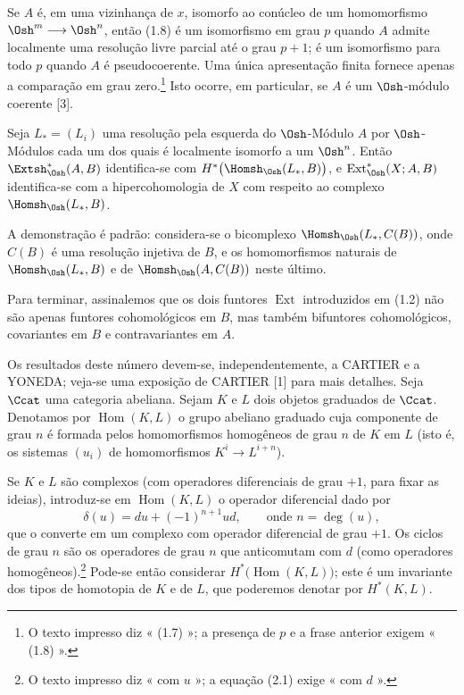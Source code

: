  Se $A$ é, em uma vizinhança de $x$, isomorfo ao
conúcleo de um homomorfismo $\Osh^{m}\longrightarrow\Osh^{n}$, então (1.8) é um isomorfismo em grau $p$ quando $A$ admite localmente uma resolução livre parcial até o grau $p+1$; é um isomorfismo para todo $p$ quando $A$ é pseudocoerente. Uma única apresentação finita fornece apenas a comparação em grau zero.\footnote{O texto impresso diz « (1.7) »; a
presença de $p$ e a frase anterior exigem « (1.8) ».} Isto ocorre, em
particular, se $A$ é um $\Osh$-módulo coerente [3].

 Seja $L_{*}=(L_i)$ uma resolução pela esquerda do
$\Osh$-Módulo $A$ por $\Osh$-Módulos cada um dos quais é localmente isomorfo a
um $\Osh^{n}$. Então $\Extsh_{\Osh}^{*}(A,B)$ identifica-se com
$H^{*}\bigl(\Homsh_{\Osh}(L_{*},B)\bigr)$, e
$\operatorname{Ext}_{\Osh}^{*}(X;A,B)$ identifica-se com a hipercohomologia de $X$
com respeito ao complexo $\Homsh_{\Osh}(L_{*},B)$.

A demonstração é padrão: considera-se o bicomplexo
$\Homsh_{\Osh}(L_{*},C(B))$, onde $C(B)$ é uma resolução injetiva de $B$, e os
homomorfismos naturais de $\Homsh_{\Osh}(L_{*},B)$ e de
$\Homsh_{\Osh}(A,C(B))$ neste último.

Para terminar, assinalemos que os dois funtores $\operatorname{Ext}$ introduzidos
em (1.2) não são apenas funtores cohomológicos em $B$, mas também
bifuntores cohomológicos, covariantes em $B$ e contravariantes em $A$.


Os resultados deste número devem-se, independentemente, a CARTIER e a YONEDA; veja-se
uma exposição de CARTIER [1] para mais detalhes. Seja $\Ccat$ uma categoria abeliana.
Sejam $K$ e $L$ dois objetos graduados de $\Ccat$. Denotamos por
$\operatorname{Hom}(K,L)$ o grupo abeliano graduado cuja componente de grau
$n$ é formada pelos homomorfismos homogêneos de grau $n$ de $K$ em $L$ (isto é,
os sistemas $(u_i)$ de homomorfismos $K^{i}\longrightarrow L^{i+n}$).

Se $K$ e $L$ são complexos (com operadores diferenciais de grau $+1$, para
fixar as ideias), introduz-se em $\operatorname{Hom}(K,L)$ o operador
diferencial dado por
\begin{equation}\tag{2.1}
  \delta(u)=du+(-1)^{n+1}ud,\qquad\text{onde }n=\deg(u),
\end{equation}
que o converte em um complexo com operador diferencial de grau $+1$. Os ciclos de
grau $n$ são os operadores de grau $n$ que anticomutam com $d$ (como
operadores homogêneos).\footnote{O texto impresso diz « com $u$ »; a equação
(2.1) exige « com $d$ ».} Pode-se então considerar
$H^{*}\bigl(\operatorname{Hom}(K,L)\bigr)$; este é um invariante dos tipos
de homotopia de $K$ e de $L$, que poderemos denotar por $H^{*}(K,L)$.

